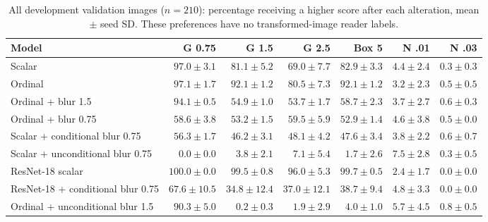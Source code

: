 \begin{table}[ht]\centering\scriptsize
\caption{All development validation images ($n=210$): percentage receiving a higher score after each alteration, mean $\pm$ seed SD. These preferences have no transformed-image reader labels.}
\begin{tabular}{lrrrrrr}\toprule Model & G 0.75 & G 1.5 & G 2.5 & Box 5 & N .01 & N .03 \\ \midrule
Scalar & $97.0\pm3.1$ & $81.1\pm5.2$ & $69.0\pm7.7$ & $82.9\pm3.3$ & $4.4\pm2.4$ & $0.3\pm0.3$ \\
Ordinal & $97.1\pm1.7$ & $92.1\pm1.2$ & $80.5\pm7.3$ & $92.1\pm1.2$ & $3.2\pm2.3$ & $0.5\pm0.5$ \\
Ordinal + blur 1.5 & $94.1\pm0.5$ & $54.9\pm1.0$ & $53.7\pm1.7$ & $58.7\pm2.3$ & $3.7\pm2.7$ & $0.6\pm0.3$ \\
Ordinal + blur 0.75 & $58.6\pm3.8$ & $53.2\pm1.5$ & $59.5\pm5.9$ & $52.9\pm1.4$ & $4.6\pm3.8$ & $0.5\pm0.0$ \\
Scalar + conditional blur 0.75 & $56.3\pm1.7$ & $46.2\pm3.1$ & $48.1\pm4.2$ & $47.6\pm3.4$ & $3.8\pm2.2$ & $0.6\pm0.7$ \\
Scalar + unconditional blur 0.75 & $0.0\pm0.0$ & $3.8\pm2.1$ & $7.1\pm5.4$ & $1.7\pm2.6$ & $7.5\pm2.8$ & $0.3\pm0.5$ \\
ResNet-18 scalar & $100.0\pm0.0$ & $99.5\pm0.8$ & $96.0\pm5.3$ & $99.7\pm0.5$ & $2.4\pm1.7$ & $0.0\pm0.0$ \\
ResNet-18 + conditional blur 0.75 & $67.6\pm10.5$ & $34.8\pm12.4$ & $37.0\pm12.1$ & $38.7\pm9.4$ & $4.8\pm3.3$ & $0.0\pm0.0$ \\
Ordinal + unconditional blur 1.5 & $90.3\pm5.0$ & $0.2\pm0.3$ & $1.9\pm2.9$ & $4.0\pm1.0$ & $5.7\pm4.5$ & $0.8\pm0.5$ \\
\bottomrule\end{tabular}\end{table}
